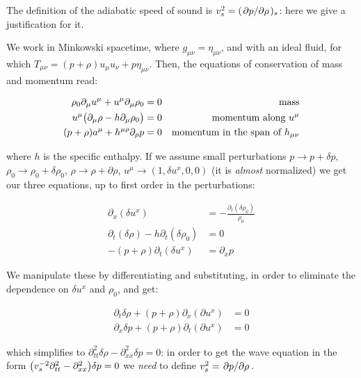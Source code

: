 \documentclass[main.tex]{subfiles}
\begin{document}
The definition of the adiabatic speed of sound is \(v_s^2 = (\pdv*{p}{\rho})_s\): here we give a justification for it.

We work in Minkowski spacetime, where \(g_{\mu\nu} = \eta_{\mu\nu}\), and with an ideal fluid, for which \(T_{\mu\nu} = (p+ \rho) u_\mu u_\nu + p \eta_{\mu\nu}\). Then, the equations of conservation of mass and momentum read:

\begin{subequations}
\begin{align}
  \rho_0 \partial_\mu u^\mu + u^\mu \partial_\mu \rho_0 &= 0 & \text{mass}  \\
  u^\mu \qty(\partial_\mu \rho - h \partial_\mu \rho_0) &=0 & \text{momentum along } u^\mu  \\
  (p+\rho) a^\mu + h^{\mu \rho} \partial_\rho p &=0 & \text{momentum in the span of } h_{\mu\nu}
\end{align}
\end{subequations}

where \(h\) is the specific enthalpy. If we assume small perturbations \(p \rightarrow p + \delta p\), \(\rho_0 \rightarrow \rho_0 + \delta \rho_0\), \(\rho \rightarrow \rho + \partial \rho\), \(u^\mu \rightarrow (1, \delta u^x, 0, 0)\) (it is \emph{almost} normalized) we get our three equations, up to first order in the perturbations:

\begin{subequations}
\begin{align}
  \partial_x (\delta u^x) &= -\frac{\partial_t (\delta \rho_0)}{\rho_0}  \\
  \partial_t (\delta \rho) - h \partial_t (\delta \rho_0) &= 0  \\
  -(p+ \rho) \partial_t (\delta u^x) &= \partial_x p
\end{align}
\end{subequations}

We manipulate these by differentiating and substituting, in order to eliminate the dependence on \(\delta u^x\) and \(\rho_0\), and get:

\begin{subequations}
\begin{align}
  \partial_t \delta \rho + (p+\rho) \partial_x (\partial u^x) &= 0 \\
  \partial_x \delta p + (p+\rho) \partial_t (\partial u^x) &= 0
\end{align}
\end{subequations}

which simplifies to \(\partial_{tt}^2 \delta \rho - \partial_{xx}^2 \delta p = 0\): in order to get the wave equation in the form \(\qty(v_s^{-2} \partial_{tt}^2 - \partial_{xx}^2 ) \delta p = 0\) we \emph{need} to define \(v_s^2 = \pdv*{p}{\rho}\).
\end{document}
